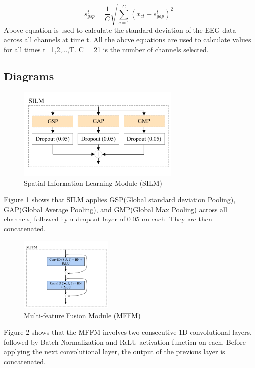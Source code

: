 \documentclass[10pt]{article}
\begin{document}
\[ s_{gsp}^t = \frac{1}{C} \sqrt{\sum_{c=1}^{C} (x_{ct} - s_{gap}^t)^2} \]
Above equation is used to calculate the standard deviation of the EEG data across all channels at time t.
\newline
All the above equations are used to calculate values for all times t=1,2,...,T. C = 21 is the number of channels selected.

\subsection{Diagrams}
\begin{figure}[H]
    \centering
    \includegraphics[width=0.7\textwidth]{silm.png}
    \caption{Spatial Information Learning Module (SILM)}
\end{figure}
Figure 1 shows that SILM applies GSP(Global standard deviation Pooling), GAP(Global Average Pooling), and GMP(Global Max Pooling) across all channels, followed by a dropout layer of 0.05 on each. They are then concatenated.

\begin{figure}[H]
    \centering
    \includegraphics[width=0.4\textwidth]{mffm.png}
    \caption{Multi-feature Fusion Module (MFFM)}
\end{figure}
Figure 2 shows that the MFFM involves two consecutive 1D convolutional layers, followed by Batch Normalization and ReLU activation function on each. Before applying the next convolutional layer, the output of the previous layer is concatenated.
\end{document}
